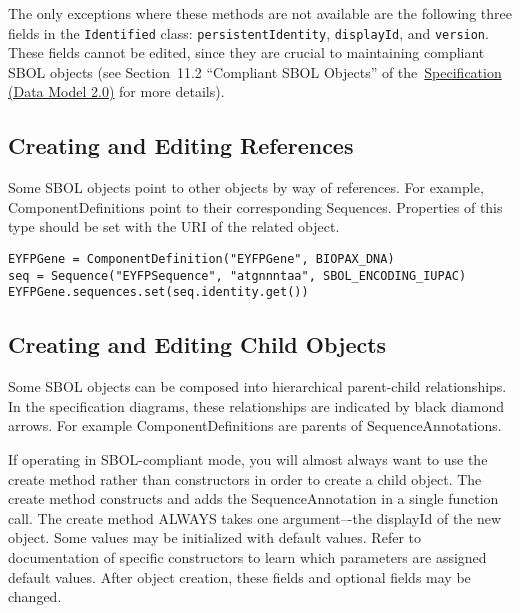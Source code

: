 The only exceptions where these methods are not available are the following three fields in the \lstinline+Identified+ class: \lstinline+persistentIdentity+, \lstinline+displayId+, and
\lstinline+version+.  These fields cannot be edited, since they are crucial to maintaining
compliant SBOL objects (see Section~11.2 ``Compliant SBOL Objects'' of the~\href{http://sbolstandard.org/downloads/specification-data-model-2-0/}{Specification
  (Data Model 2.0)} for more details).

\subsection*{Creating and Editing References}

Some SBOL objects point to other objects by way of references. For example, ComponentDefinitions point to their corresponding Sequences. Properties of this type should be set with the URI of the related object.

\vspace{\abovedisplayskip}
\begin{minipage}{0.95\textwidth} 
\begin{lstlisting}
EYFPGene = ComponentDefinition("EYFPGene", BIOPAX_DNA)
seq = Sequence("EYFPSequence", "atgnnntaa", SBOL_ENCODING_IUPAC)
EYFPGene.sequences.set(seq.identity.get())
\end{lstlisting}
\end{minipage}

\subsection*{Creating and Editing Child Objects}
Some SBOL objects can be composed into hierarchical parent-child relationships. In the specification diagrams, these relationships are indicated by black diamond arrows. For example ComponentDefinitions are parents of SequenceAnnotations. 

If operating in SBOL-compliant mode, you will almost always want to use the create method rather than constructors in order to create a child object. The create method constructs and adds the SequenceAnnotation in a single function call. The create method ALWAYS takes one argument–-the displayId of the new object. Some values may be initialized with default values. Refer to documentation of specific constructors to learn which parameters are assigned default values. After object creation, these fields and optional fields may be changed. 

